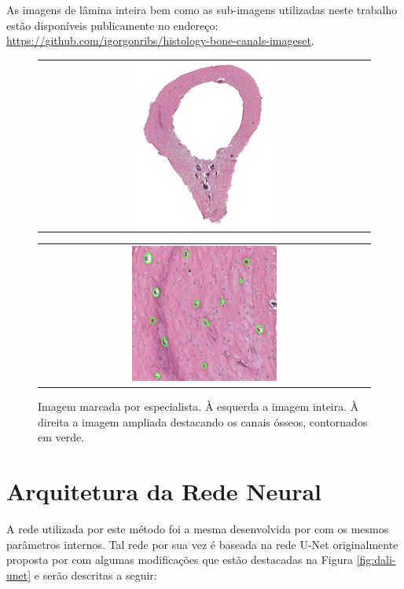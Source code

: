 As imagens de lâmina inteira bem como as sub-imagens utilizadas neste trabalho estão disponíveis publicamente no endereço: \href{https://github.com/igorgonribs/histology-bone-canals-imageset}{https://github.com/igorgonribs/histology-bone-canals-imageset}.

\begin{figure}[h]
    \center
    \begin{tabular}{@{}c@{}}
        \includegraphics[width=0.45\textwidth]{figures/3_methods/imagem_marcada_inteira.png}
    \end{tabular}
    \begin{tabular}{@{}c@{}}
        \includegraphics[width=0.45\textwidth]{figures/3_methods/imagem_marcada_ampliada.jpg}
    \end{tabular}
  
    \caption[Marcação do especialista para o método proposto.]{Imagem marcada por especialista. À esquerda a imagem inteira. À direita a imagem ampliada destacando os canais ósseos, contornados em verde.}
    \label{fig:labelled-images}
\end{figure}

\section{Arquitetura da Rede Neural}
A rede utilizada por este método foi a mesma desenvolvida por \cite{santos2022automated} com os mesmos parâmetros internos. Tal rede por sua vez é baseada na rede U-Net originalmente proposta por \cite{ronneberger2015u} com algumas modificações que estão destacadas na Figura \ref{fig:dali-unet} e serão descritas a seguir:


